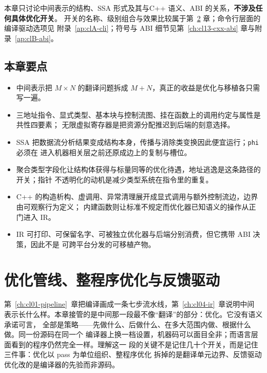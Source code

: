 \documentclass[12pt,a4paper,fontset=fandol]{ctexbook}
\newcommand{\cpp}[1]{C++#1}
\newcommand{\Tp}[1]{\texttt{#1}}
\newcommand{\Mx}[1]{\textsf{#1}}
\begin{document}
\begin{note}[title={本章范围声明}]
本章只讨论中间表示的结构、SSA 形式及其与\cpp{} 语义、ABI 的关系，\textbf{不涉及任何具体优化开关}。
开关的名称、级别组合与效果比较属于第~\ref{ch:cl05-passes} 章；命令行层面的编译驱动选项见
附录~\ref{ap:clA-cli}；符号与 ABI 细节见第~\ref{ch:cl13-cxx-abi} 章与附录~\ref{ap:clB-abi}。
\end{note}

\section{本章要点}\label{sec:cl04-summary}

\begin{itemize}
  \item 中间表示把 $M \times N$ 的翻译问题拆成 $M + N$，真正的收益是优化与移植各只需写一遍。
  \item 三地址指令、显式类型、基本块与控制流图、挂在函数上的调用约定与属性是共性四要素；
        无限虚拟寄存器是把资源分配推迟到后端的刻意选择。
  \item SSA 把数据流分析结果变成结构本身，传播与消除类变换因此便宜运行；\Tp{phi} 必须在
        进入机器相关层之前还原成边上的复制与槽位。
  \item 聚合类型字段化让结构体获得与标量同等的优化待遇，地址逃逸是这条路径的开关；指针
        不透明化的动机是减少类型系统在指令里的重复。
  \item \cpp{} 的构造析构、虚调用、异常清理展开成显式调用与额外控制流边，边界由可观察行为定义；
        内建函数则让标准不规定而优化器已知语义的操作从正门进入 IR。
  \item IR 可打印、可保留名字、可被独立优化器与后端分别消费，但它携带 ABI 决策，因此不是
        可跨平台分发的可移植产物。
\end{itemize}

\chapter{优化管线、整程序优化与反馈驱动}\label{ch:cl05-passes}

第~\ref{ch:cl01-pipeline}~章把编译画成一条七步流水线，第~\ref{ch:cl04-ir}~章说明中间
表示长什么样。本章接管的是中间那一段最不像“翻译”的部分：优化。它没有语义承诺可言，
全部是策略——先做什么、后做什么、在多大范围内做、根据什么做。同一份源码在同一个
编译器上换一档设置，机器码可以面目全非；而语言层面看到的程序仍然完全一样。理解这一
段的关键不是记住几十个开关，而是记住三件事：优化以 \Mx{pass} 为单位组织、整程序优化
拆掉的是翻译单元边界、反馈驱动优化改的是编译器的先验而非源码。
\end{document}
